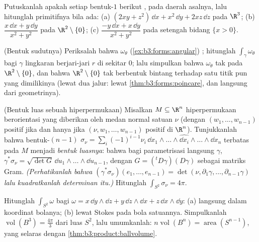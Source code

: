 \begin{exercise}[$\star\star$]\label{exo:b3:forms:3}
Putuskanlah apakah setiap bentuk-$1$ berikut ,  pada daerah asalnya,
lalu hitunglah primitifnya bila ada:
(a) $(2xy + z^2)\,\dd x + x^2\,\dd y + 2xz\,\dd z$ pada
$\R^3$;
(b) $\dfrac{x\,\dd x + y\,\dd y}{x^2 + y^2}$ pada
$\R^2\setminus\{0\}$;
(c) $\dfrac{-y\,\dd x + x\,\dd y}{x^2 + y^2}$ pada
setengah bidang $\{x > 0\}$.
\end{exercise}

\begin{exercise}[$\star\star$]\label{exo:b3:forms:4}
(Bentuk sudutnya) Periksalah bahwa $\omega_\theta$
(\cref{ex:b3:forms:angular}) ; hitunglah
$\int_\gamma\omega_\theta$ bagi $\gamma$ lingkaran berjari-jari
$r$ di sekitar $0$; lalu simpulkan bahwa $\omega_\theta$ tak 
pada $\R^2\setminus\{0\}$, dan bahwa $\R^2\setminus\{0\}$ tak
berbentuk bintang terhadap satu titik pun yang dimilikinya (lewat dua jalur:
lewat \cref{thm:b3:forms:poincare}, dan langsung dari
geometrinya).
\end{exercise}

\begin{exercise}[$\star\star$]\label{exo:b3:forms:5}
(Bentuk luas sebuah hiperpermukaan) Misalkan $M \subseteq \R^n$
hiperpermukaan  berorientasi yang  diberikan oleh
medan normal satuan $\nu$ (dengan $(w_1, \dots, w_{n-1})$ positif
jika dan hanya jika $(\nu, w_1, \dots, w_{n-1})$ positif di $\R^n$). Tunjukkanlah
bahwa bentuk-$(n-1)$ $\sigma_\nu =
\sum_i(-1)^{i-1}\nu_i\,\dd x_1\wedge\dots\wedge\widehat{\dd
x_i}\wedge\dots\wedge\dd x_n$ terbatas pada $M$ menjadi
\emph{bentuk luasnya}: bahwa bagi parametrisasi langsung $\gamma$,
$\gamma^*\sigma_\nu = \sqrt{\det G}\,\dd u_1\wedge\dots
\wedge\dd u_{n-1}$, dengan $G = ({}^t D\gamma)(D\gamma)$ sebagai
matriks Gram. \emph{(Perhatikanlah bahwa
$(\gamma^*\sigma_\nu)(e_1, \dots, e_{n-1}) = \det(\nu,
\partial_1\gamma, \dots, \partial_{n-1}\gamma)$ lalu kuadratkanlah
determinan itu.)} Hitunglah $\int_{S^2}\sigma_\nu = 4\pi$.
\end{exercise}

\begin{exercise}[$\star\star$]\label{exo:b3:forms:6}
Hitunglah $\int_{S^2}\omega$ bagi $\omega = x\,\dd y\wedge\dd z
+ y\,\dd z\wedge\dd x + z\,\dd x\wedge\dd y$: (a) langsung
dalam koordinat bolanya; (b) lewat Stokes pada bola satuannya.
Simpulkanlah $\operatorname{vol}(B^3) = \frac{4\pi}3$ dari
luas $S^2$, lalu umumkanlah:
$n\operatorname{vol}(B^n) = \operatorname{area}(S^{n-1})$,
yang selaras dengan \cref{thm:b3:product:ballvolume}.
\end{exercise}

